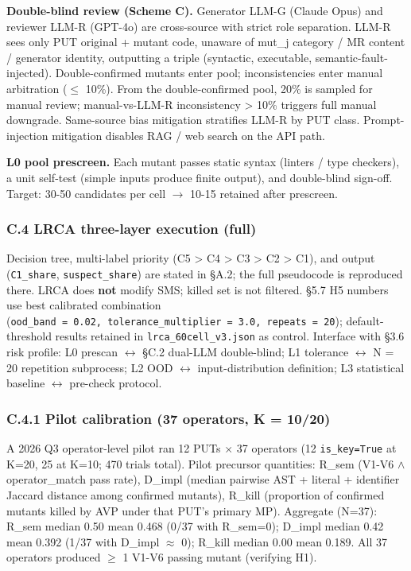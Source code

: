 \documentclass[review,12pt,authoryear]{elsarticle}
\begin{document}
\textbf{Double-blind review (Scheme C).} Generator LLM-G (Claude Opus)
and reviewer LLM-R (GPT-4o) are cross-source with strict role
separation. LLM-R sees only PUT original + mutant code, unaware of
mut\_j category / MR content / generator identity, outputting a triple
(syntactic, executable, semantic-fault-injected). Double-confirmed
mutants enter pool; inconsistencies enter manual arbitration ($\leq$ 10\%).
From the double-confirmed pool, 20\% is sampled for manual review;
manual-vs-LLM-R inconsistency \textgreater{} 10\% triggers full manual
downgrade. Same-source bias mitigation stratifies LLM-R by PUT class.
Prompt-injection mitigation disables RAG / web search on the API path.

\textbf{L0 pool prescreen.} Each mutant passes static syntax (linters /
type checkers), a unit self-test (simple inputs produce finite output),
and double-blind sign-off. Target: 30-50 candidates per cell $\to$ 10-15
retained after prescreen.

\subsubsection{C.4 LRCA three-layer execution
(full)}\label{c.4-lrca-three-layer-execution-full}

Decision tree, multi-label priority (C5 \textgreater{} C4 \textgreater{}
C3 \textgreater{} C2 \textgreater{} C1), and output (\texttt{C1\_share},
\texttt{suspect\_share}) are stated in §A.2; the full pseudocode is
reproduced there. LRCA does \textbf{not} modify SMS; killed set is not
filtered. §5.7 H5 numbers use best calibrated combination
(\texttt{ood\_band\ =\ 0.02,\ tolerance\_multiplier\ =\ 3.0,\ repeats\ =\ 20});
default-threshold results retained in \texttt{lrca\_60cell\_v3.json} as
control. Interface with §3.6 risk profile: L0 prescan $\leftrightarrow$ §C.2 dual-LLM
double-blind; L1 tolerance $\leftrightarrow$ N = 20 repetition subprocess; L2 OOD $\leftrightarrow$
input-distribution definition; L3 statistical baseline $\leftrightarrow$ pre-check
protocol.

\subsubsection{C.4.1 Pilot calibration (37 operators, K =
10/20)}\label{c.4.1-pilot-calibration-37-operators-k-1020}

A 2026 Q3 operator-level pilot ran 12 PUTs $\times$ 37 operators (12
\texttt{is\_key=True} at K=20, 25 at K=10; 470 trials total). Pilot
precursor quantities: R\_sem (V1-V6 $\wedge$ operator\_match pass rate),
D\_impl (median pairwise AST + literal + identifier Jaccard distance
among confirmed mutants), R\_kill (proportion of confirmed mutants
killed by AVP under that PUT's primary MP). Aggregate (N=37): R\_sem
median 0.50 mean 0.468 (0/37 with R\_sem=0); D\_impl median 0.42 mean
0.392 (1/37 with D\_impl $\approx$ 0); R\_kill median 0.00 mean 0.189. All 37
operators produced $\geq$ 1 V1-V6 passing mutant (verifying H1).
\end{document}
